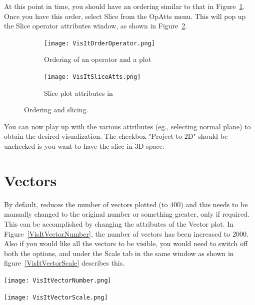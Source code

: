 At this point in time, you should have an ordering similar to that in
Figure~\ref{VisItOrderOperator}.  Once you have this order, select
Slice from the OpAtts menu. This will pop up the Slice operator
attributes window, as shown in Figure~\ref{VisItSliceAtts}.
\begin{figure}[htbp!]
  \begin{subfigure}[b]{0.5\textwidth}
    \centering
    \texttt{[image: VisItOrderOperator.png]}
    \caption{Ordering of an operator and a plot}
    \label{VisItOrderOperator}
  \end{subfigure}
  \begin{subfigure}[b]{0.5\textwidth}
    \centering
    \texttt{[image: VisItSliceAtts.png]}
    \caption{Slice plot attributes in \Visit}
    \label{VisItSliceAtts}
  \end{subfigure}
  \caption{Ordering and slicing.}
  \label{ucf:fig2}
\end{figure}

You can now play up with the various attributes (eg., selecting normal
plane) to obtain the desired visualization. The checkbox "Project to
2D" should be unchecked is you want to have the slice in 3D space.

\section{Vectors}
By default, \Visit reduces the number of vectors plotted (to 400) and
this needs to be manually changed to the original number or something
greater, only if required.  This can be accomplished by changing the
attributes of the Vector plot. In Figure~\ref{VisItVectorNumber}, the
number of vectors has been increased to 2000.
Also if you would like all the vectors to be visible, you would need
to switch off both the options,  and
 under the Scale tab in the same window as
shown in figure~\ref{VisItVectorScale} describes this.

\begin{minipage}{\textwidth}
  \begin{minipage}{0.5\textwidth}
  \centering
  \texttt{[image: VisItVectorNumber.png]}
  \label{VisItVectorNumber}
  \end{minipage}
  \begin{minipage}{0.5\textwidth}
  \centering
  \texttt{[image: VisItVectorScale.png]}
  \label{VisItVectorScale}
  \end{minipage}
\end{minipage}


